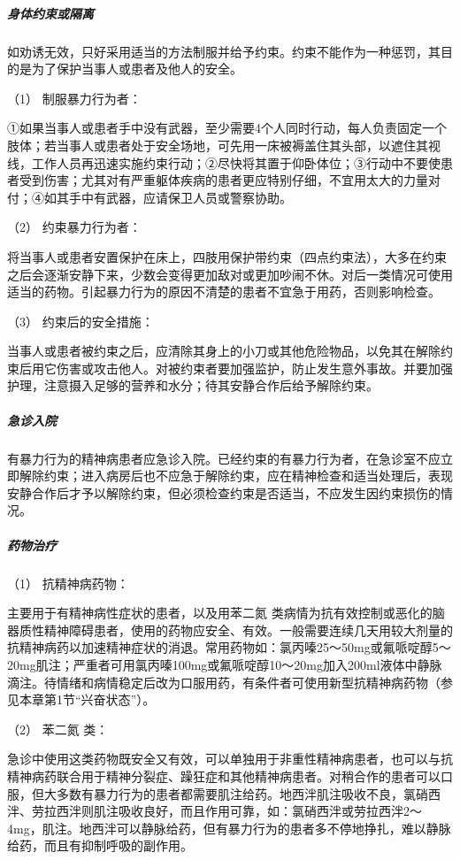 \subparagraph{身体约束或隔离}

如劝诱无效，只好采用适当的方法制服并给予约束。约束不能作为一种惩罚，其目的是为了保护当事人或患者及他人的安全。

\hypertarget{text00054.htmlux5cux23CHP1-18-12-3-3-1}{}
（1） 制服暴力行为者：

①如果当事人或患者手中没有武器，至少需要4个人同时行动，每人负责固定一个肢体；若当事人或患者处于安全场地，可先用一床被褥盖住其头部，以遮住其视线，工作人员再迅速实施约束行动；②尽快将其置于仰卧体位；③行动中不要使患者受到伤害；尤其对有严重躯体疾病的患者更应特别仔细，不宜用太大的力量对付；④如其手中有武器，应请保卫人员或警察协助。

\hypertarget{text00054.htmlux5cux23CHP1-18-12-3-3-2}{}
（2） 约束暴力行为者：

将当事人或患者安置保护在床上，四肢用保护带约束（四点约束法），大多在约束之后会逐渐安静下来，少数会变得更加敌对或更加吵闹不休。对后一类情况可使用适当的药物。引起暴力行为的原因不清楚的患者不宜急于用药，否则影响检查。

\hypertarget{text00054.htmlux5cux23CHP1-18-12-3-3-3}{}
（3） 约束后的安全措施：

当事人或患者被约束之后，应清除其身上的小刀或其他危险物品，以免其在解除约束后用它伤害或攻击他人。对被约束者要加强监护，防止发生意外事故。并要加强护理，注意摄入足够的营养和水分；待其安静合作后给予解除约束。

\subparagraph{急诊入院}

有暴力行为的精神病患者应急诊入院。已经约束的有暴力行为者，在急诊室不应立即解除约束；进入病房后也不应急于解除约束，应在精神检查和适当处理后，表现安静合作后才予以解除约束，但必须检查约束是否适当，不应发生因约束损伤的情况。

\subparagraph{药物治疗}

\hypertarget{text00054.htmlux5cux23CHP1-18-12-3-5-1}{}
（1） 抗精神病药物：

主要用于有精神病性症状的患者，以及用苯二氮{}
类病情为抗有效控制或恶化的脑器质性精神障碍患者，使用的药物应安全、有效。一般需要连续几天用较大剂量的抗精神病药以加速精神症状的消退。常用药物如：氯丙嗪25～50mg或氟哌啶醇5～20mg肌注；严重者可用氯丙嗪100mg或氟哌啶醇10～20mg加入200ml液体中静脉滴注。待情绪和病情稳定后改为口服用药，有条件者可使用新型抗精神病药物（参见本章第1节“兴奋状态”）。

\hypertarget{text00054.htmlux5cux23CHP1-18-12-3-5-2}{}
（2） 苯二氮{} 类：

急诊中使用这类药物既安全又有效，可以单独用于非重性精神病患者，也可以与抗精神病药联合用于精神分裂症、躁狂症和其他精神病患者。对稍合作的患者可以口服，但大多数有暴力行为的患者都需要肌注给药。地西泮肌注吸收不良，氯硝西泮、劳拉西泮则肌注吸收良好，而且作用可靠，如：氯硝西泮或劳拉西泮2～
4mg，肌注。地西泮可以静脉给药，但有暴力行为的患者多不停地挣扎，难以静脉给药，而且有抑制呼吸的副作用。

